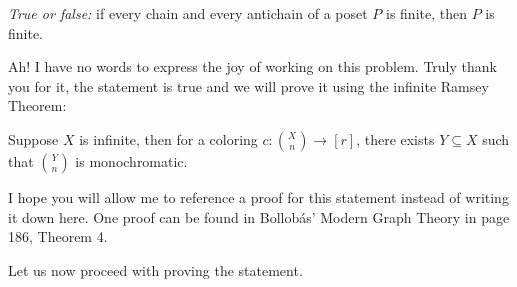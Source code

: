 \documentclass[12pt]{memoir}
\begin{document}
\begin{Ej}[Exercise 9]
    \emph{True or false:} if every chain and every antichain of a poset $P$ is finite, then $P$ is finite. 
\end{Ej}

Ah! I have no words to express the joy of working on this problem. Truly thank you for it, the statement is true and we will prove it using the infinite Ramsey Theorem:

\begin{Th}
Suppose $X$ is infinite, then for a coloring $c:\binom{X}{n}\to [r]$, there exists $Y\subseteq X$ such that $\binom{Y}{n}$ is monochromatic.
\end{Th}

I hope you will allow me to reference a proof for this statement instead of writing it down here. One proof can be found in Bollobás' Modern Graph Theory in page 186, Theorem 4.\par 
Let us now proceed with proving the statement.
\end{document}
